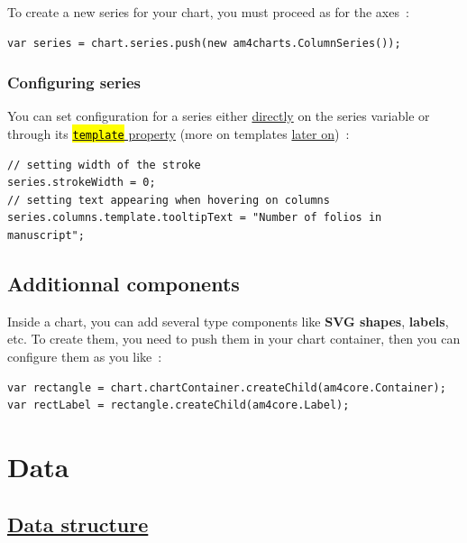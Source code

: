 \documentclass[a4paper,12pt,twoside]{book}
\let\OldTexttt\texttt
\renewcommand{\texttt}[1]{\OldTexttt{\hl{#1}}}
\begin{document}
To create a new series for your chart, you must proceed as for the axes~:

\begin{lstlisting}
var series = chart.series.push(new am4charts.ColumnSeries());
\end{lstlisting}

				\subsubsection{Configuring series}\label{configuring-series}

You can set configuration for a series either \href{https://www.amcharts.com/docs/v4/reference/series/}{directly} on the series variable or through its \href{https://www.amcharts.com/docs/v4/concepts/series/\#Templates}{\texttt{template} property} (more on templates \href{https://gitlab.obspm.fr/gtopalian/DISHAS/wikis/AmCharts/developper_general_introduction\#templates}{later on})~:

\begin{lstlisting}
// setting width of the stroke
series.strokeWidth = 0;
// setting text appearing when hovering on columns
series.columns.template.tooltipText = "Number of folios in manuscript";
\end{lstlisting}

			\subsection{Additionnal components}\label{additionnal-components}

Inside a chart, you can add several type components like \textbf{SVG shapes}, \textbf{labels}, etc. To create them, you need to push them in your chart container, then you can configure them as you like~:

\begin{lstlisting}
var rectangle = chart.chartContainer.createChild(am4core.Container);
var rectLabel = rectangle.createChild(am4core.Label);
\end{lstlisting}

		\section{Data}\label{data}

			\subsection{\href{https://www.amcharts.com/docs/v4/concepts/data/\#Structure_of_data}{Data structure}}\label{data-structure}
\end{document}
